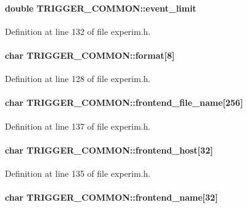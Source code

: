 \paragraph[{event\_\-limit}]{\setlength{\rightskip}{0pt plus 5cm}double {\bf TRIGGER\_\-COMMON::event\_\-limit}}\hfill\label{structTRIGGER__COMMON_a5daf454915d6eddbf8e21b215ed16645}


Definition at line 132 of file experim.h.
\paragraph[{format}]{\setlength{\rightskip}{0pt plus 5cm}char {\bf TRIGGER\_\-COMMON::format}\mbox{[}8\mbox{]}}\hfill\label{structTRIGGER__COMMON_ab9eb2734b70e190f8f97e1108d22efb6}


Definition at line 128 of file experim.h.
\paragraph[{frontend\_\-file\_\-name}]{\setlength{\rightskip}{0pt plus 5cm}char {\bf TRIGGER\_\-COMMON::frontend\_\-file\_\-name}\mbox{[}256\mbox{]}}\hfill\label{structTRIGGER__COMMON_a1bf9c2eede90a44f8798049ae8cc7ea6}


Definition at line 137 of file experim.h.
\paragraph[{frontend\_\-host}]{\setlength{\rightskip}{0pt plus 5cm}char {\bf TRIGGER\_\-COMMON::frontend\_\-host}\mbox{[}32\mbox{]}}\hfill\label{structTRIGGER__COMMON_aaeca389295e7ddc381121574674b485e}


Definition at line 135 of file experim.h.
\paragraph[{frontend\_\-name}]{\setlength{\rightskip}{0pt plus 5cm}char {\bf TRIGGER\_\-COMMON::frontend\_\-name}\mbox{[}32\mbox{]}}\hfill\label{structTRIGGER__COMMON_a0e3b22acf358369dbcb7db66646763d8}


